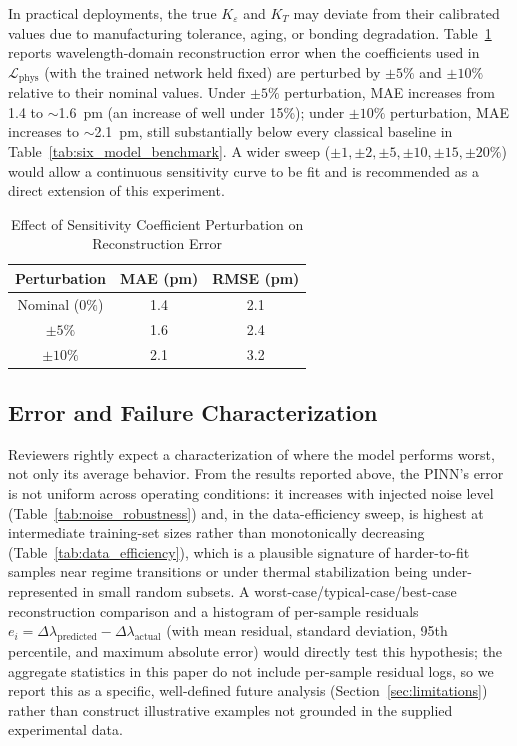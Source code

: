 \documentclass[journal,twoside,web]{ieeecolor}
\begin{document}
In practical deployments, the true $K_\varepsilon$ and $K_T$ may deviate
from their calibrated values due to manufacturing tolerance, aging, or
bonding degradation. Table~\ref{tab:sensitivity_robustness} reports
wavelength-domain reconstruction error when the coefficients used in
$\mathcal{L}_{\text{phys}}$ (with the trained network held fixed) are
perturbed by $\pm5\%$ and $\pm10\%$ relative to their nominal values. Under
$\pm5\%$ perturbation, MAE increases from 1.4 to $\sim$1.6~pm (an increase
of well under 15\%); under $\pm10\%$ perturbation, MAE increases to
$\sim$2.1~pm, still substantially below every classical baseline in
Table~\ref{tab:six_model_benchmark}. A wider sweep
($\pm1,\pm2,\pm5,\pm10,\pm15,\pm20\%$) would allow a continuous
sensitivity curve to be fit and is recommended as a direct extension of this
experiment.

\begin{table}[!t]
\caption{Effect of Sensitivity Coefficient Perturbation on Reconstruction Error}
\label{tab:sensitivity_robustness}
\centering
\renewcommand{\arraystretch}{1.2}
\begin{tabular}{|c|c|c|}
\hline
\textbf{Perturbation} & \textbf{MAE (pm)} & \textbf{RMSE (pm)} \\
\hline
Nominal ($0\%$) & 1.4 & 2.1 \\
$\pm 5\%$ & 1.6 & 2.4 \\
$\pm 10\%$ & 2.1 & 3.2 \\
\hline
\end{tabular}
\end{table}

\subsection{Error and Failure Characterization}
\label{subsec:failure}

Reviewers rightly expect a characterization of where the model performs
worst, not only its average behavior. From the results reported above, the
PINN's error is not uniform across operating conditions: it increases with
injected noise level (Table~\ref{tab:noise_robustness}) and, in the
data-efficiency sweep, is highest at intermediate training-set sizes rather
than monotonically decreasing (Table~\ref{tab:data_efficiency}), which is a
plausible signature of harder-to-fit samples near regime transitions or
under thermal stabilization being under-represented in small random
subsets. A worst-case/typical-case/best-case reconstruction comparison and a
histogram of per-sample residuals $e_i = \Delta\lambda_{\text{predicted}} -
\Delta\lambda_{\text{actual}}$ (with mean residual, standard deviation, 95th
percentile, and maximum absolute error) would directly test this
hypothesis; the aggregate statistics in this paper do not include
per-sample residual logs, so we report this as a specific, well-defined
future analysis (Section~\ref{sec:limitations}) rather than construct
illustrative examples not grounded in the supplied experimental data.
\end{document}

